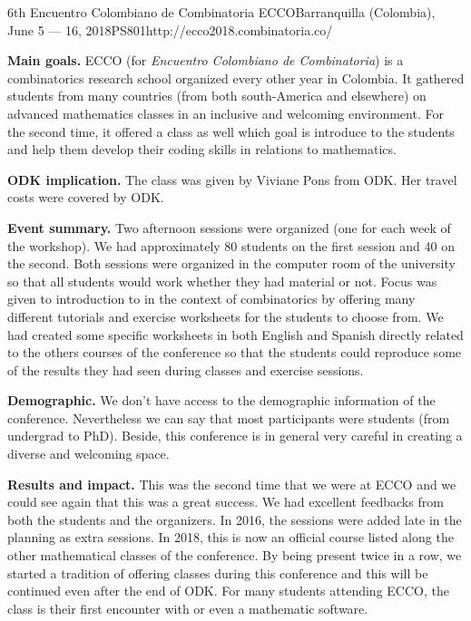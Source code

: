 \begin{event}{6th Encuentro Colombiano de Combinatoria }{ECCO}{Barranquilla (Colombia), June 5 --- 16, 2018}{PS}{80}{1}{http://ecco2018.combinatoria.co/}

\textbf{Main goals.} ECCO (for \textit{Encuentro Colombiano de Combinatoria}) is a combinatorics research school organized every other year in Colombia. It gathered students from many countries (from both south-America and elsewhere) on advanced mathematics classes in an inclusive and welcoming environment. For the second time, it offered a \Sage class as well which goal is introduce \Sage to the students and help them develop their coding skills in relations to mathematics.

\textbf{ODK implication.} The \Sage class was given by Viviane Pons from ODK. Her travel costs were covered by ODK.

\textbf{Event summary.} Two afternoon sessions were organized (one for each week of the workshop). We had approximately 80 students on the first session and 40 on the second. Both sessions were organized in the computer room of the university so that all students would work whether they had material or not. Focus was given to introduction to \Sage in the context of combinatorics by offering many different tutorials and exercise worksheets for the students to choose from. We had created some specific worksheets in both English and Spanish directly related to the others courses of the conference so that the students could reproduce some of the results they had seen during classes and exercise sessions.

\textbf{Demographic.} We don't have access to the demographic information of the conference. Nevertheless we can say that most participants were students (from undergrad to PhD). Beside, this conference is in general very careful in creating a diverse and welcoming space.

\textbf{Results and impact.} This was the second time that we were at ECCO and we could see again that this was a great success. We had excellent feedbacks from both the students and the organizers. In 2016, the \Sage sessions were added late in the planning as extra sessions. In 2018, this is now an official \Sage course listed along the other mathematical classes of the conference. By being present twice in a row, we started a tradition of offering \Sage classes during this conference and this will be continued even after the end of ODK. For many students attending ECCO, the \Sage class is their first encounter with \Sage or even a mathematic software.


\end{event}

